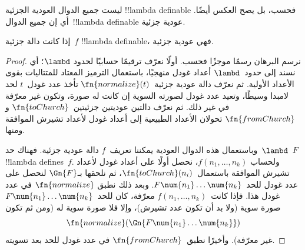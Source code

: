 \documentclass[../../../include/open-logic-section]{subfiles}
\begin{document}

ليست جميع الدوال العودية الجزئية !!{lambda definable} فحسب، بل يصح
العكس أيضًا. أي إن جميع الدوال~!!{lambda definable} عودية جزئية.

\begin{thm}
   إذا كانت دالة جزئية~$f$
  !!{lambda definable}، فهي عودية جزئية.
\end{thm}

\begin{proof}
  نرسم البرهان رسمًا موجزًا فحسب. أولًا نعرّف ترقيمًا حسابيًا لحدود
  $\lambd$؛ أي نسند إلى حدود~$\lambd$ أعداد غودل منهجيًا، باستعمال
  الترميز المعتاد للمتتاليات بقوى الأعداد الأولية. ثم نعرّف دالة عودية
  جزئية~$\fn{normalize}(t)$ تأخذ عدد غودل~$t$ لحد لامبدا وسيطًا، وتعيد
  عدد غودل لصورته السوية إن كانت له صورة، وتكون غير معرّفة في غير
  ذلك. ثم نعرّف دالتين عوديتين جزئيتين~$\fn{toChurch}$ و
  $\fn{fromChurch}$ تحولان الأعداد الطبيعية إلى أعداد غودل لأعداد
  تشيرش الموافقة ومنها.

  وباستعمال هذه الدوال العودية يمكننا تعريف~$f$ دالة عودية جزئية.
  فهناك حد~$\lambd$~$F$ !!{lambda define}s~$f$. ولحساب
  $f(n_1, \dots, n_k)$، نحصل أولًا على أعداد غودل لأعداد تشيرش
  الموافقة باستعمال~$\fn{toChurch}(n_i)$، ثم نلحقها بـ$\Gn{F}$ لنحصل
  على عدد غودل للحد~$F \num{n_1}\dots\num{n_k}$. وبعد ذلك نطبق
  $\fn{normalize}$ في عدد غودل هذا. فإذا كانت~$f(n_1, \dots, n_k)$
  معرّفة، كان للحد~$F \num{n_1}\dots\num{n_k}$ صورة سوية (ولا بد أن
  تكون عدد تشيرش)، وإلا فلا صورة سوية له (ومن ثم تكون
  \[\fn{normalize}(\Gn{F\num{n_1}\dots\num{n_k}})\]
  غير معرّفة). وأخيرًا نطبق~$\fn{fromChurch}$ في عدد غودل للحد بعد
  تسويته.
\end{proof}
\end{document}
